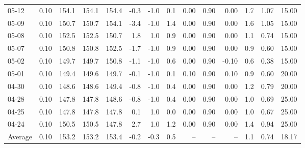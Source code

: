 \begin{threeparttable}
{\begin{tabular}{lrrrrrrrrrrrrr}
  05-12 &     0.10 & 154.1 & 154.1 & 154.4 &       -0.3 &                     -1.0 &                 0.1 &       0.00 &      0.90 &           0.00 &              1.7 &            1.07 &                  15.00 \\
  05-09 &     0.10 & 150.7 & 150.7 & 154.1 &       -3.4 &                     -1.0 &                 1.4 &       0.00 &      0.90 &           0.00 &              1.6 &            1.05 &                  15.00 \\
  05-08 &     0.10 & 152.5 & 152.5 & 150.7 &        1.8 &                      1.0 &                 0.9 &       0.00 &      0.90 &           0.00 &              1.1 &            0.74 &                  15.00 \\
  05-07 &     0.10 & 150.8 & 150.8 & 152.5 &       -1.7 &                     -1.0 &                 0.9 &       0.00 &      0.90 &           0.00 &              0.9 &            0.60 &                  15.00 \\
  05-02 &     0.10 & 149.7 & 149.7 & 150.8 &       -1.1 &                     -1.0 &                 0.6 &       0.00 &      0.90 &          -0.10 &              0.6 &            0.38 &                  15.00 \\
  05-01 &     0.10 & 149.4 & 149.6 & 149.7 &       -0.1 &                     -1.0 &                 0.1 &       0.10 &      0.90 &           0.10 &              0.9 &            0.60 &                  20.00 \\
  04-30 &     0.10 & 148.6 & 148.6 & 149.4 &       -0.8 &                     -1.0 &                 0.4 &       0.00 &      0.90 &           0.00 &              1.2 &            0.79 &                  20.00 \\
  04-28 &     0.10 & 147.8 & 147.8 & 148.6 &       -0.8 &                     -1.0 &                 0.4 &       0.00 &      0.90 &           0.00 &              1.0 &            0.69 &                  25.00 \\
  04-25 &     0.10 & 147.8 & 147.8 & 147.8 &        0.1 &                      1.0 &                 0.0 &       0.00 &      0.90 &           0.00 &              1.0 &            0.67 &                  25.00 \\
  04-24 &     0.10 & 150.5 & 150.5 & 147.8 &        2.7 &                      1.0 &                 1.2 &       0.00 &      0.90 &           0.00 &              1.4 &            0.94 &                  25.00 \\
Average &     0.10 & 153.2 & 153.2 & 153.4 &       -0.2 &                     -0.3 &                 0.5 &         -- &        -- &             -- &              1.1 &            0.74 &                  18.17 \\

\end{tabular}}
\end{threeparttable}
